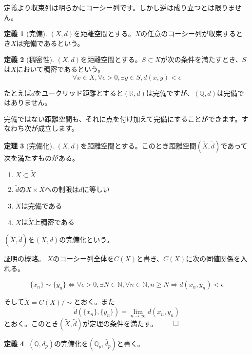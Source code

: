 \documentclass[uplatex]{jsarticle}
\newcommand{\Q}{\mathbb{Q}}
\newcommand{\R}{\mathbb{R}}
\theoremstyle{definition} %
\newtheorem{thm}{定理}
\newtheorem{defi}[thm]{定義}
\begin{document}
定義より収束列は明らかにコーシー列です。しかし逆は成り立つとは限りません。

\begin{oframed}\begin{defi}[完備]
$(X, d)$を距離空間とする。$X$の任意のコーシー列が収束するとき$X$は完備であるという。
\end{defi}\end{oframed}


\begin{oframed}\begin{defi}[稠密性]
$(X, d)$を距離空間とする。$S \subset X$が次の条件を満たすとき、$S$は$X$において稠密であるという。
\[
\forall x \in X, \forall \epsilon > 0, \exists y \in S, d(x, y) < \epsilon
\]
\end{defi}\end{oframed}

たとえば$d$をユークリッド距離とすると$(\R, d)$は完備ですが、$(\Q, d)$は完備ではありません。

完備ではない距離空間も、それに点を付け加えて完備にすることができます。すなわち次が成立します。

\begin{oframed}\begin{thm}[完備化]
$(X, d)$を距離空間とする。このとき距離空間$(\tilde{X}, \tilde{d})$であって次を満たすものがある。
\begin{enumerate}
\item $X \subset \tilde{X}$
\item $\tilde{d}$の$X \times X$への制限は$d$に等しい
\item $\tilde{X}$は完備である
\item $X$は$\tilde{X}$上稠密である
\end{enumerate}
$(\tilde{X}, \tilde{d})$を$(X,d)$の完備化という。
\end{thm}\end{oframed}
\noindent 証明の概略。
$X$のコーシー列全体を$C(X)$と書き、$C(X)$に次の同値関係を入れる。

\[\{x_n\} \sim \{y_n\} \iff \forall \epsilon > 0, \exists N \in \mathbb{N}, \forall n \in \mathbb{N}, n \geq N \Rightarrow d(x_n, y_n) < \epsilon\]

そして$\tilde{X} = C(X)/\sim$とおく。また
\[\tilde{d}(\{x_n\}, \{y_n\}) = \lim_{n\to\infty} d(x_n, y_n)\]
とおく。このとき$(\tilde{X}, \tilde{d})$が定理の条件を満たす。 $\qed$

\begin{oframed}\begin{defi}
$(\Q, d_p)$の完備化を$(\Q_p, \tilde{d_p})$と書く。
\end{defi}\end{oframed}
\end{document}
